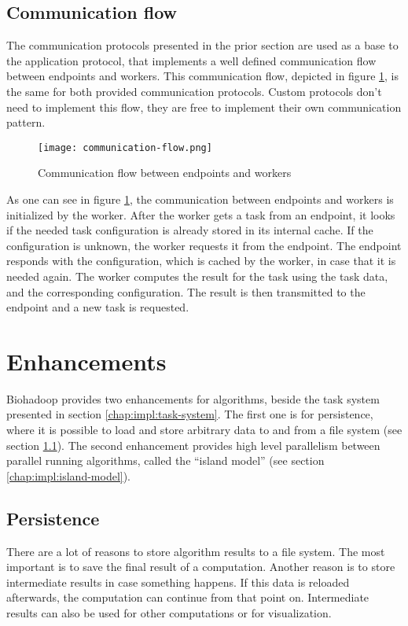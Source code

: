 \subsection{Communication flow}
\label{chap:impl:communication-flow}
The communication protocols presented in the prior section are used as a base to the application protocol, that implements a well defined communication flow between endpoints and workers. This communication flow, depicted in figure \ref{fig:communication-flow}, is the same for both provided communication protocols. Custom protocols don't need to implement this flow, they are free to implement their own communication pattern.

\begin{figure}[ht!]
  \centering
  \texttt{[image: communication-flow.png]}
  \caption{Communication flow between endpoints and workers}
  \label{fig:communication-flow}
\end{figure}

As one can see in figure \ref{fig:communication-flow}, the communication between endpoints and workers is initialized by the worker. After the worker gets a task from an endpoint, it looks if the needed task configuration is already stored in its internal cache. If the configuration is unknown, the worker requests it from the endpoint. The endpoint responds with the configuration, which is cached by the worker, in case that it is needed again. The worker computes the result for the task using the task data, and the corresponding configuration. The result is then transmitted to the endpoint and a new task is requested.

\section{Enhancements}
\label{chap:impl:enhancements}
Biohadoop provides two enhancements for algorithms, beside the task system presented in section \ref{chap:impl:task-system}. The first one is for persistence, where it is possible to load and store arbitrary data to and from a file system (see section \ref{chap:impl:persistence}). The second enhancement provides high level parallelism between parallel running algorithms, called the ``island model'' (see section \ref{chap:impl:island-model}).

\subsection{Persistence}
\label{chap:impl:persistence}
There are a lot of reasons to store algorithm results to a file system. The most important is to save the final result of a computation. Another reason is to store intermediate results in case something happens. If this data is reloaded afterwards, the computation can continue from that point on. Intermediate results can also be used for other computations or for visualization.

